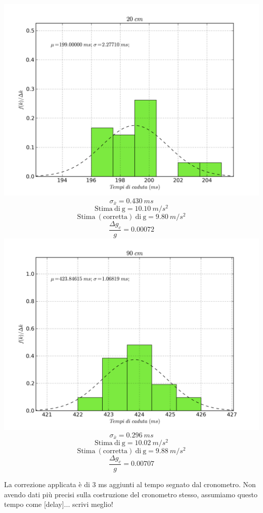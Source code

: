 \begin{center}
\includegraphics[scale=0.75]{../grafici/20cm.png}
$$\sigma_{\bar{x}} = 0.430\ ms$$
$$\mathrm{Stima\ di\ g} = 10.10\ m/s^2$$
$$\mathrm{Stima\ (corretta)\ di\ g} = 9.80\ m/s^2 $$
$$\frac{\Delta g_c}{g} = 0.00072$$
\includegraphics[scale=0.75]{../grafici/90cm.png}
$$\sigma_{\bar{x}} = 0.296\ ms $$
$$\mathrm{Stima\ di\ g} = 10.02\ m/s^2$$
$$\mathrm{Stima\ (corretta)\ di\ g} = 9.88\ m/s^2 $$
$$\frac{\Delta g_c}{g} = 0.00707$$
\end{center}

La correzione applicata è di 3 ms aggiunti al tempo segnato dal cronometro. Non avendo dati più precisi sulla costruzione del cronometro stesso, assumiamo questo tempo come [delay]... scrivi meglio!

